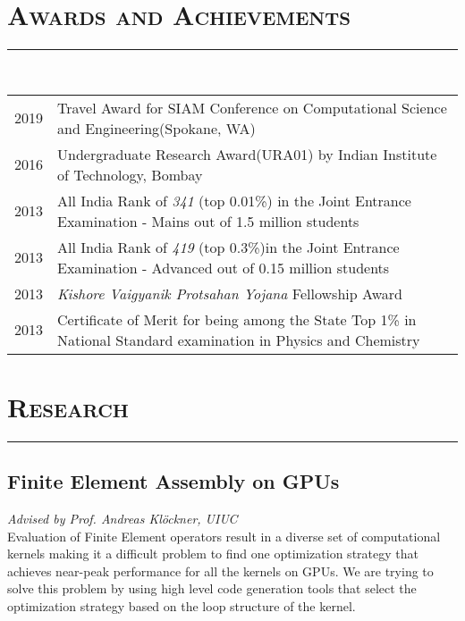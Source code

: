 \documentclass[letterpaper, 13pt]{article}
\begin{document}
\section*{\Large\textsc{Awards and Achievements}}
\vspace{-4ex}
\rule{\textwidth}{0.1ex}
\vspace{1ex}\\
\begin{tabular}{p{} p{}}
2019    &   Travel Award for SIAM Conference on Computational Science and Engineering(Spokane, WA) \vspace{1ex}\\
2016    &   Undergraduate Research Award(URA01) by Indian Institute of Technology, Bombay \vspace{1ex}\\
2013    &   All India Rank of \textit{341} (top 0.01\%) in the Joint Entrance Examination - Mains out of 1.5 million students \vspace{1ex} \\
2013    &   All India Rank of \textit{419} (top 0.3\%)in the Joint Entrance Examination - Advanced out of 0.15 million students\vspace{1ex} \\
2013    &   \textit{Kishore Vaigyanik Protsahan Yojana} Fellowship Award\vspace{1ex} \\
2013    &   Certificate of Merit for being among the State Top 1\% in National Standard examination in Physics and Chemistry \\
\end{tabular} 



\section*{\Large\textsc{Research}}
\vspace{-4ex}
\rule{\textwidth}{0.1ex}

\subsection*{Finite Element Assembly on GPUs}
\vspace{-1ex}
\small \textit{Advised by Prof. Andreas Kl\"{o}ckner, UIUC}\\
Evaluation of Finite Element operators result in a diverse set of computational kernels making it a difficult problem to find one optimization strategy that achieves near-peak performance for all the kernels on GPUs.
We are trying to solve this problem by using high level code generation tools that select the optimization strategy based on the loop structure of the kernel.
\end{document}

